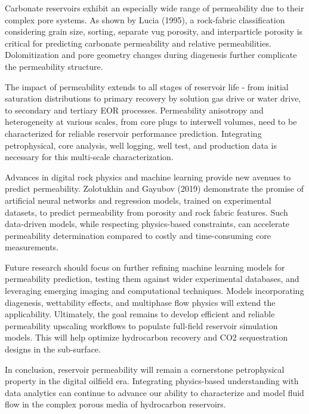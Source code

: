 \documentclass[journal]{IEEEtran}
\begin{document}
Carbonate reservoirs exhibit an especially wide range of permeability due to their complex pore systems. As shown by Lucia (1995), a rock-fabric classification considering grain size, sorting, separate vug porosity, and interparticle porosity is critical for predicting carbonate permeability and relative permeabilities. Dolomitization and pore geometry changes during diagenesis further complicate the permeability structure.

The impact of permeability extends to all stages of reservoir life - from initial saturation distributions to primary recovery by solution gas drive or water drive, to secondary and tertiary EOR processes. Permeability anisotropy and heterogeneity at various scales, from core plugs to interwell volumes, need to be characterized for reliable reservoir performance prediction. Integrating petrophysical, core analysis, well logging, well test, and production data is necessary for this multi-scale characterization.

Advances in digital rock physics and machine learning provide new avenues to predict permeability. Zolotukhin and Gayubov (2019) demonstrate the promise of artificial neural networks and regression models, trained on experimental datasets, to predict permeability from porosity and rock fabric features. Such data-driven models, while respecting physics-based constraints, can accelerate permeability determination compared to costly and time-consuming core measurements.

Future research should focus on further refining machine learning models for permeability prediction, testing them against wider experimental databases, and leveraging emerging imaging and computational techniques. Models incorporating diagenesis, wettability effects, and multiphase flow physics will extend the applicability. Ultimately, the goal remains to develop efficient and reliable permeability upscaling workflows to populate full-field reservoir simulation models. This will help optimize hydrocarbon recovery and CO2 sequestration designs in the sub-surface.

In conclusion, reservoir permeability will remain a cornerstone petrophysical property in the digital oilfield era. Integrating physics-based understanding with data analytics can continue to advance our ability to characterize and model fluid flow in the complex porous media of hydrocarbon reservoirs.

\newpage
\printbibliography[heading=bibintoc]
\end{document}
